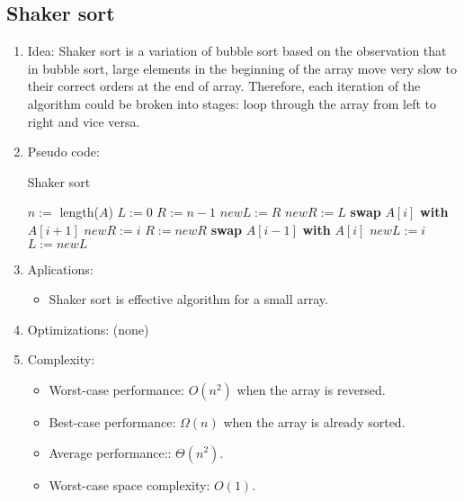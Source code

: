 \documentclass[12pt]{article}
\begin{document}
    \subsection{Shaker sort}
    \begin{enumerate}
        \item Idea: Shaker sort is a variation of bubble sort based on the observation that in bubble sort, large elements in the beginning of the array move very slow to their correct orders at the end of array. Therefore, each iteration of the algorithm could be broken into stages: loop through the array from left to right and vice versa.
        \item Pseudo code:
        \begin{algorithm}[H]
            \caption{Shaker sort}
            \begin{algorithmic}[1]
                    \State $n:=$ length($A$)
                    \State $L:=0$
                    \State $R:=n-1$
                        \State $\textit{newL}:=R$
                        \State $\textit{newR}:=L$
                                \State \textbf{swap} $A[i]$ \textbf{with} $A[i+1]$
                                \State $\textit{newR}:=i$
                            \EndIf
                        \EndFor
                        \State $R:=\textit{newR}$
                                \State \textbf{swap} $A[i-1]$ \textbf{with} $A[i]$
                                \State $\textit{newL}:=i$
                            \EndIf
                        \EndFor
                        \State $L:=\textit{newL}$
                    \EndWhile
                \EndFunction
            \end{algorithmic}
        \end{algorithm}
        \item Aplications:
        \begin{itemize}
            \item Shaker sort is effective algorithm for a small array.
        \end{itemize}
        \item Optimizations: (none)
        \item Complexity:
        \begin{itemize}
            \item Worst-case performance: $O(n^2)$ when the array is reversed.
            \item Best-case performance: $\Omega(n)$ when the array is already sorted.
            \item Average performance:: $\Theta(n^2)$.
            \item Worst-case space complexity: $O(1)$.
        \end{itemize}
    \end{enumerate}
\end{document}
